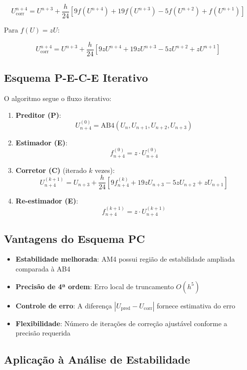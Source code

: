 \documentclass[a4paper,12pt]{article}
\begin{document}
\[
U^{n+4}_{\text{corr}} = U^{n+3} + \frac{h}{24}\left[9f(U^{n+4}) + 19f(U^{n+3}) - 5f(U^{n+2}) + f(U^{n+1})\right]
\]

Para $f(U) = zU$:

\[
U^{n+4}_{\text{corr}} = U^{n+3} + \frac{h}{24}\left[9zU^{n+4} + 19zU^{n+3} - 5zU^{n+2} + zU^{n+1}\right]
\]

\subsection{Esquema P-E-C-E Iterativo}

O algoritmo segue o fluxo iterativo:

\begin{enumerate}
    \item \textbf{Preditor (P)}: 
        \[ U^{(0)}_{n+4} = \text{AB4}(U_n, U_{n+1}, U_{n+2}, U_{n+3}) \]
    
    \item \textbf{Estimador (E)}: 
        \[ f^{(0)}_{n+4} = z \cdot U^{(0)}_{n+4} \]
    
    \item \textbf{Corretor (C)} (iterado $k$ vezes):
        \[ U^{(k+1)}_{n+4} = U_{n+3} + \frac{h}{24}\left[9f^{(k)}_{n+4} + 19zU_{n+3} - 5zU_{n+2} + zU_{n+1}\right] \]
    
    \item \textbf{Re-estimador (E)}:
        \[ f^{(k+1)}_{n+4} = z \cdot U^{(k+1)}_{n+4} \]
\end{enumerate}

\subsection{Vantagens do Esquema PC}

\begin{itemize}
    \item \textbf{Estabilidade melhorada}: AM4 possui região de estabilidade ampliada comparada à AB4
    \item \textbf{Precisão de 4ª ordem}: Erro local de truncamento $O(h^5)$
    \item \textbf{Controle de erro}: A diferença $|U_{\text{pred}} - U_{\text{corr}}|$ fornece estimativa do erro
    \item \textbf{Flexibilidade}: Número de iterações de correção ajustável conforme a precisão requerida
\end{itemize}

\subsection{Aplicação à Análise de Estabilidade}
\end{document}
